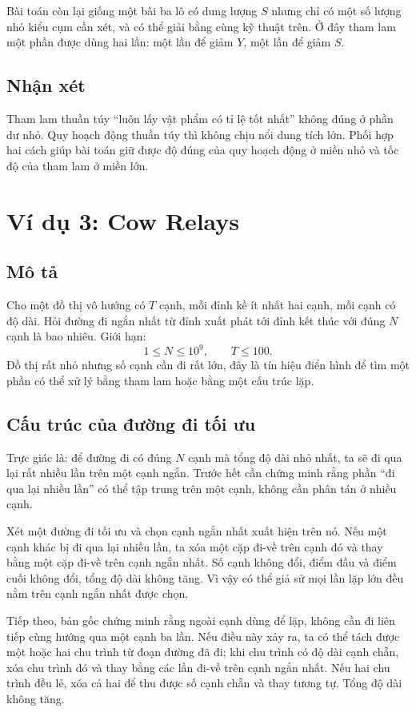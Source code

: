\documentclass[11pt]{article}
\begin{document}
Bài toán còn lại giống một bài ba lô có dung lượng \(S\) nhưng chỉ có một số
lượng nhỏ kiểu cụm cần xét, và có thể giải bằng cùng kỹ thuật trên. Ở đây
tham lam một phần được dùng hai lần: một lần để giảm \(Y\), một lần để giảm
\(S\).

\subsection{Nhận xét}

Tham lam thuần túy ``luôn lấy vật phẩm có tỉ lệ tốt nhất'' không đúng ở phần
dư nhỏ. Quy hoạch động thuần túy thì không chịu nổi dung tích lớn. Phối hợp
hai cách giúp bài toán giữ được độ đúng của quy hoạch động ở miền nhỏ và tốc
độ của tham lam ở miền lớn.

\section{Ví dụ 3: Cow Relays}

\subsection{Mô tả}

Cho một đồ thị vô hướng có \(T\) cạnh, mỗi đỉnh kề ít nhất hai cạnh, mỗi cạnh
có độ dài. Hỏi đường đi ngắn nhất từ đỉnh xuất phát tới đỉnh kết thúc với đúng
\(N\) cạnh là bao nhiêu. Giới hạn:
\[
  1\le N\le 10^9,\qquad T\le 100.
\]
Đồ thị rất nhỏ nhưng số cạnh cần đi rất lớn, đây là tín hiệu điển hình để tìm
một phần có thể xử lý bằng tham lam hoặc bằng một cấu trúc lặp.

\subsection{Cấu trúc của đường đi tối ưu}

Trực giác là: để đường đi có đúng \(N\) cạnh mà tổng độ dài nhỏ nhất, ta sẽ đi
qua lại rất nhiều lần trên một cạnh ngắn. Trước hết cần chứng minh rằng phần
``đi qua lại nhiều lần'' có thể tập trung trên một cạnh, không cần phân tán ở
nhiều cạnh.

Xét một đường đi tối ưu và chọn cạnh ngắn nhất xuất hiện trên nó. Nếu một cạnh
khác bị đi qua lại nhiều lần, ta xóa một cặp đi-về trên cạnh đó và thay bằng
một cặp đi-về trên cạnh ngắn nhất. Số cạnh không đổi, điểm đầu và điểm cuối
không đổi, tổng độ dài không tăng. Vì vậy có thể giả sử mọi lần lặp lớn đều
nằm trên cạnh ngắn nhất được chọn.

Tiếp theo, bản gốc chứng minh rằng ngoài cạnh dùng để lặp, không cần đi liên
tiếp cùng hướng qua một cạnh ba lần. Nếu điều này xảy ra, ta có thể tách được
một hoặc hai chu trình từ đoạn đường đã đi; khi chu trình có độ dài cạnh chẵn,
xóa chu trình đó và thay bằng các lần đi-về trên cạnh ngắn nhất. Nếu hai chu
trình đều lẻ, xóa cả hai để thu được số cạnh chẵn và thay tương tự. Tổng độ
dài không tăng.
\end{document}
